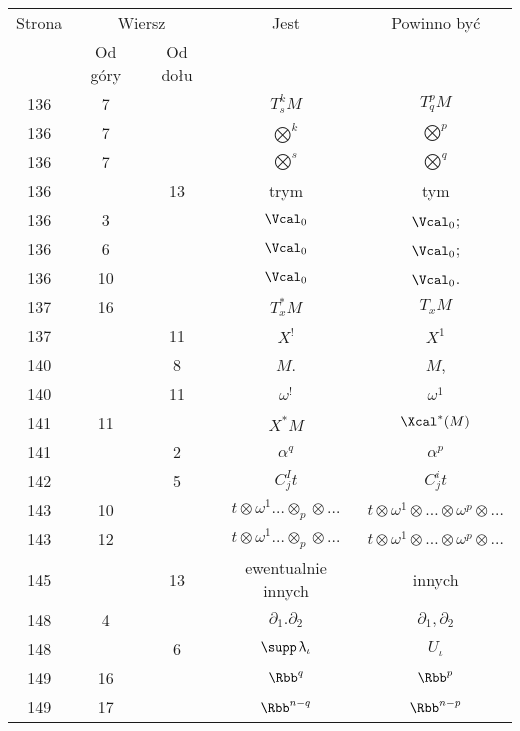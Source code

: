 \documentclass[a4paper,11pt]{article}
\numberwithin{equation}{section}
\renewcommand{\lambda}{\uplambda}
\begin{document}
\begin{center}
  \begin{tabular}{|c|c|c|c|c|}
    \hline
    Strona & \multicolumn{2}{c|}{Wiersz} & Jest
                              & Powinno być \\ \cline{2-3}
    & Od góry & Od dołu & & \\
    \hline
    136 & \hphantom{0}7 & & $T^{ k }_{ s }M$ & $T^{ p }_{ q }M$ \\
    136 & \hphantom{0}7 & & $\bigotimes^{ k }$ & $\bigotimes^{ p }$ \\
    136 & \hphantom{0}7 & & $\bigotimes^{ s }$ & $\bigotimes^{ q }$ \\
    136 & & 13 & trym & tym \\
    136 & \hphantom{0}3 & & $\Vcal_{ 0 }$ & $\Vcal_{ 0 }$; \\
    136 & \hphantom{0}6 & & $\Vcal_{ 0 }$ & $\Vcal_{ 0 }$; \\
    136 & 10 & & $\Vcal_{ 0 }$ & $\Vcal_{ 0 }$. \\
    137 & 16 & & $T^{ * }_{ x }M$ & $T_{ x }M$ \\
    137 & & 11 & $X^{ ! }$ & $X^{ 1 }$ \\
    140 & & \hphantom{0}8 & $M$. & $M$, \\
    140 & & 11 & $\omega^{ ! }$ & $\omega^{ 1 }$ \\
    141 & 11 & & $X^{ * } M$ & $\Xcal^{ * }( M )$ \\
    141 & & \hphantom{0}2 & $\alpha^{ q }$ & $\alpha^{ p }$ \\
    142 & & \hphantom{0}5 & $C^{ I }_{ j } t$ & $C^{ i }_{ j } t$ \\
    143 & 10 & & $t \otimes \omega^{ 1 } \ldots \otimes_{ p } \otimes \ldots$
           & $t \otimes \omega^{ 1 } \otimes \ldots \otimes \omega^{ p } \otimes \ldots$ \\
    143 & 12 & & $t \otimes \omega^{ 1 } \ldots \otimes_{ p } \otimes \ldots$
           & $t \otimes \omega^{ 1 } \otimes \ldots \otimes \omega^{ p } \otimes \ldots$ \\
    145 & & 13 & ewentualnie innych & innych \\
    148 & \hphantom{0}4 & & $\partial_{ 1 }.\partial_{ 2 }$ & $\partial_{ 1 }, \partial_{ 2 }$ \\
    148 & & \hphantom{0}6 & $\supp\, \lambda_{ \iota }$ & $U_{ \iota }$ \\
    149 & 16 & & $\Rbb^{ q }$ & $\Rbb^{ p }$ \\
    149 & 17 & & $\Rbb^{ n - q }$ & $\Rbb^{ n - p }$ \\

\end{tabular}
\end{center}
\end{document}
